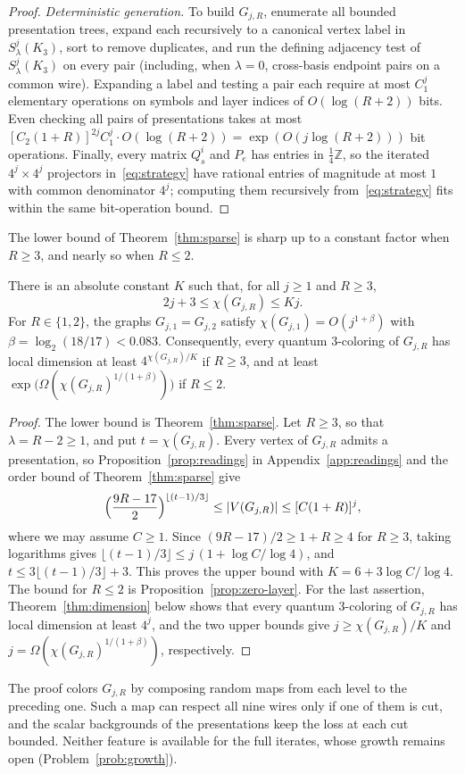 \begin{proof}
\emph{Deterministic generation.} To build $G_{j,R}$, enumerate all bounded presentation trees, expand each recursively to a canonical vertex label in $S^j_\lambda(K_3)$, sort to remove duplicates, and run the defining adjacency test of $S^j_\lambda(K_3)$ on every pair (including, when $\lambda=0$, cross-basis endpoint pairs on a common wire). Expanding a label and testing a pair each require at most $C_1^j$ elementary operations on symbols and layer indices of $O(\log(R+2))$ bits. Even checking all pairs of presentations takes at most $[C_2(1+R)]^{2j}C_1^j\cdot O(\log(R+2))=\exp(O(j\log(R+2)))$ bit operations. Finally, every matrix $Q^i_s$ and $P_e$ has entries in $\tfrac14\mathbb Z$, so the iterated $4^j\times 4^j$ projectors in~\eqref{eq:strategy} have rational entries of magnitude at most $1$ with common denominator $4^j$; computing them recursively from~\eqref{eq:strategy} fits within the same bit-operation bound.
\end{proof}

The lower bound of Theorem~\ref{thm:sparse} is sharp up to a constant factor when $R\ge3$, and nearly so when $R\le2$.

\begin{corollary}\label{cor:linear-growth}
There is an absolute constant $K$ such that, for all $j\ge1$ and $R\ge3$,
\[
 2j+3\le\chi(G_{j,R})\le Kj .
\]
For $R\in\{1,2\}$, the graphs $G_{j,1}=G_{j,2}$ satisfy $\chi(G_{j,1})=O(j^{1+\beta})$ with $\beta=\log_2(18/17)<0.083$. Consequently, every quantum $3$-coloring of $G_{j,R}$ has local dimension at least $4^{\chi(G_{j,R})/K}$ if $R\ge3$, and at least $\exp\bigl(\Omega(\chi(G_{j,R})^{1/(1+\beta)})\bigr)$ if $R\le2$.
\end{corollary}
\begin{proof}
The lower bound is Theorem~\ref{thm:sparse}. Let $R\ge3$, so that $\lambda=R-2\ge1$, and put $t=\chi(G_{j,R})$. Every vertex of $G_{j,R}$ admits a presentation, so Proposition~\ref{prop:readings} in Appendix~\ref{app:readings} and the order bound of Theorem~\ref{thm:sparse} give
\[
 \Bigl(\frac{9R-17}{2}\Bigr)^{\lfloor(t-1)/3\rfloor}\le|V(G_{j,R})|\le[C(1+R)]^j,
\]
where we may assume $C\ge1$. Since $(9R-17)/2\ge1+R\ge4$ for $R\ge3$, taking logarithms gives $\lfloor(t-1)/3\rfloor\le j\,(1+\log C/\log4)$, and $t\le3\lfloor(t-1)/3\rfloor+3$. This proves the upper bound with $K=6+3\log C/\log4$. The bound for $R\le2$ is Proposition~\ref{prop:zero-layer}. For the last assertion, Theorem~\ref{thm:dimension} below shows that every quantum $3$-coloring of $G_{j,R}$ has local dimension at least $4^j$, and the two upper bounds give $j\ge\chi(G_{j,R})/K$ and $j=\Omega(\chi(G_{j,R})^{1/(1+\beta)})$, respectively.
\end{proof}

The proof colors $G_{j,R}$ by composing random maps from each level to the preceding one. Such a map can respect all nine wires only if one of them is cut, and the scalar backgrounds of the presentations keep the loss at each cut bounded. Neither feature is available for the full iterates, whose growth remains open (Problem~\ref{prob:growth}).
